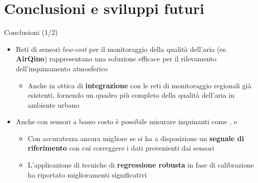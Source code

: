 \section{Conclusioni e sviluppi futuri}
\begin{frame}{Conclusioni (1/2)}
\begin{itemize}
  \item Reti di sensori \textit{low-cost} per il monitoraggio della qualità dell'aria (es. \textbf{AirQino}) rappresentano una soluzione efficace per il rilevamento dell'inquinamento atmosferico\vspace{0.2cm}
  \begin{itemize}
    \item Anche in ottica di \textbf{integrazione} con le reti di monitoraggio regionali già esistenti, fornendo un quadro più completo della qualità dell'aria in ambiente urbano
  \end{itemize}\vspace{0.2cm}
  \item Anche con sensori a basso costo è possibile misurare inquinanti come ,  e \vspace{0.2cm}
  \begin{itemize}
    \item Con accuratezza ancora migliore se si ha a disposizione un \textbf{segnale di riferimento} con cui correggere i dati provenienti dai sensori\vspace{0.1cm}
    \item L'applicazione di tecniche di \textbf{regressione robusta} in fase di calibrazione ha riportato miglioramenti significativi
  \end{itemize}
\end{itemize}
\end{frame}

